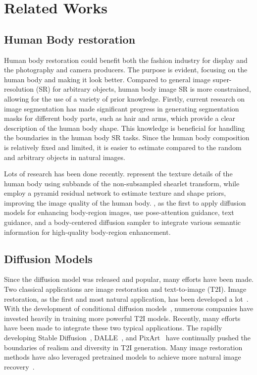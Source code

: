 \section{Related Works}
\vspace{-1mm}
\subsection{Human Body restoration}
\vspace{-1mm}
Human body restoration could benefit both the fashion industry for display and the photography and camera producers. The purpose is evident, focusing on the human body and making it look better. Compared to general image super-resolution (SR) for arbitrary objects, human body image SR is more constrained, allowing for the use of a variety of prior knowledge. Firstly, current research on image segmentation has made significant progress in generating segmentation masks for different body parts, such as hair and arms, which provide a clear description of the human body shape. This knowledge is beneficial for handling the boundaries in the human body SR tasks. Since the human body composition is relatively fixed and limited, it is easier to estimate compared to the random and arbitrary objects in natural images. 

Lots of research has been done recently. \cite{Liu2021HumanBodySR} represent the texture details of the human body using subbands of the non-subsampled shearlet transform, while \cite{Wang2024PRCN} employ a pyramid residual network to estimate texture and shape priors, improving the image quality of the human body. \cite{Zhang2024DiffBody}, as the first to apply diffusion models for enhancing body-region images, use pose-attention guidance, text guidance, and a body-centered diffusion sampler to integrate various semantic information for high-quality body-region enhancement.

\vspace{-1mm}
\subsection{Diffusion Models}
\vspace{-1mm}
Since the diffusion model was released and popular, many efforts have been made. Two classical applications are image restoration and text-to-image (T2I). Image restoration, as the first and most natural application, has been developed a lot~\cite{
saharia2021image,whang2021deblurringstochasticrefinement,Avrahami_2022_CVPR,chen2023image,xia2023diffir}. With the development of conditional diffusion models~\cite{Rombach2022LDM}, numerous companies have invested heavily in training more powerful T2I models. Recently, many efforts have been made to integrate these two typical applications. The rapidly developing Stable Diffusion~\cite{Rombach2022LDM}, DALLE~\cite{pmlr-v139-ramesh21a}, and PixArt~\cite{chen2024pixartalpha} have continually pushed the boundaries of realism and diversity in T2I generation. Many image restoration methods have also leveraged pretrained models to achieve more natural image recovery~\cite{wu2024seesr,yang2023pasd,lin2024diffbir,wu2024osediff,wang2024osdface}.

